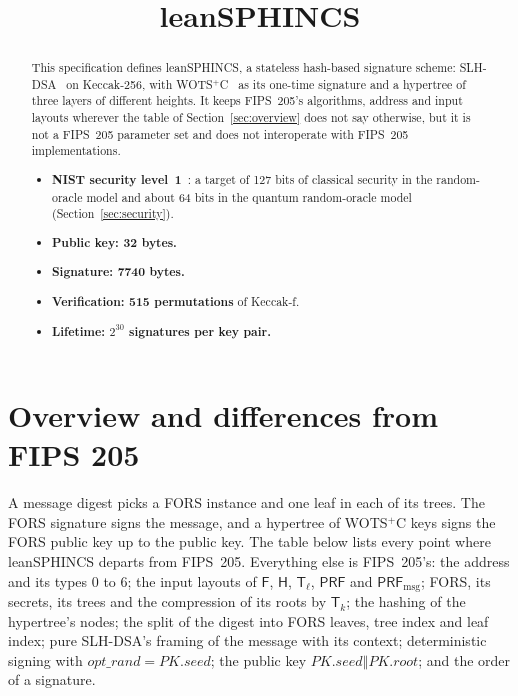 \documentclass[11pt]{article}
\title{leanSPHINCS}
\author{}
\date{}
\newcommand{\PRF}{\mathsf{PRF}}
\newcommand{\PRFmsg}{\mathsf{PRF}_{\mathrm{msg}}}
\newcommand{\concat}{\mathbin\Vert}
\newcommand{\pkseed}{\mathit{PK.seed}}
\newcommand{\pkroot}{\mathit{PK.root}}
\begin{document}
\maketitle

\begin{abstract}

This specification defines leanSPHINCS, a stateless hash-based signature scheme: SLH-DSA~\cite{FIPS205} on Keccak-256, with WOTS$^+$C~\cite{HK22C} as its one-time signature and a hypertree of three layers of different heights. It keeps FIPS~205's algorithms, address and input layouts wherever the table of Section~\ref{sec:overview} does not say otherwise, but it is not a FIPS~205 parameter set and does not interoperate with FIPS~205 implementations.

\begin{itemize}
  \item \textbf{NIST security level~1}~\cite{NISTPQC}: a target of 127 bits of classical security in the random-oracle model and about 64 bits in the quantum random-oracle model (Section~\ref{sec:security}).
  \item \textbf{Public key: 32 bytes.}
  \item \textbf{Signature: 7740 bytes.}
  \item \textbf{Verification: 515 permutations} of Keccak-f.
  \item \textbf{Lifetime: $2^{30}$ signatures per key pair.}
\end{itemize}
\end{abstract}

\section{Overview and differences from FIPS 205}
\label{sec:overview}

A message digest picks a FORS instance and one leaf in each of its trees. The FORS signature signs the message, and a hypertree of WOTS$^+$C keys signs the FORS public key up to the public key. The table below lists every point where leanSPHINCS departs from FIPS~205. Everything else is FIPS~205's: the address and its types $0$ to $6$; the input layouts of $\mathsf F$, $\mathsf H$, $\mathsf T_\ell$, $\PRF$ and $\PRFmsg$; FORS, its secrets, its trees and the compression of its roots by $\mathsf T_k$; the hashing of the hypertree's nodes; the split of the digest into FORS leaves, tree index and leaf index; pure SLH-DSA's framing of the message with its context; deterministic signing with $\mathit{opt\_rand}=\pkseed$; the public key $\pkseed\concat\pkroot$; and the order of a signature.
\end{document}
